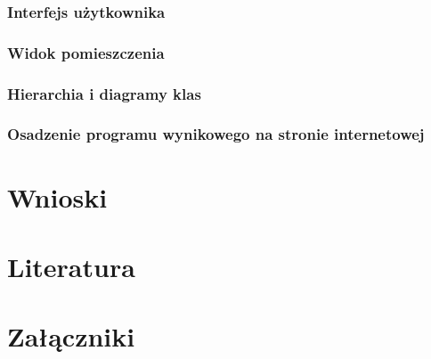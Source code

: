 \documentclass{article} %
\begin{document}
        \subsubsection{Interfejs użytkownika}
        \subsubsection{Widok pomieszczenia}
        \subsubsection{Hierarchia i diagramy klas}
        \subsubsection{Osadzenie programu wynikowego na stronie internetowej}



\section{Wnioski}


\newpage
\section{Literatura}

\newpage
\section{Załączniki}
\end{document}
